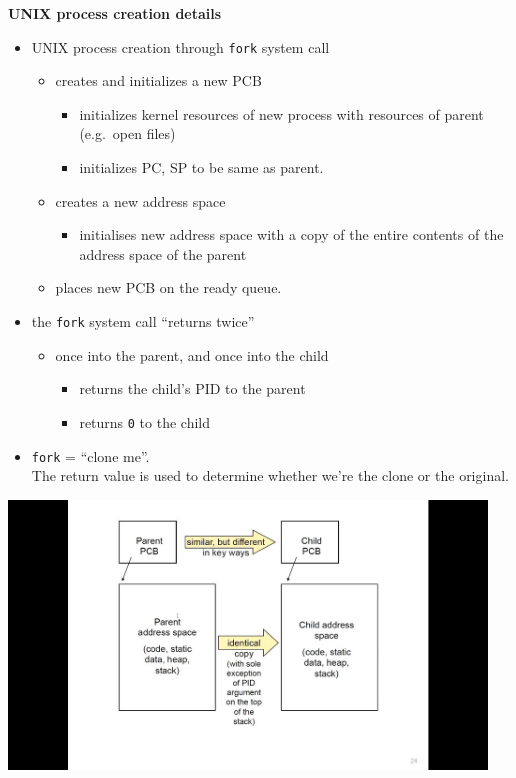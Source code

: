 \documentclass[11pt,a4paper]{article}
\begin{document}
\textbf{UNIX process creation details}
\begin{itemize}
    \item UNIX process creation through \texttt{fork} system call
        \begin{itemize}
            \item creates and initializes a new PCB
                \begin{itemize}
                    \item initializes kernel resources of new process with resources of parent
                        (e.g.\ open files)
                    \item initializes PC, SP to be same as parent.
                \end{itemize}
            \item creates a new address space
                \begin{itemize}
                    \item initialises new address space with a copy of the entire contents of
                        the address space of the parent
                \end{itemize}
            \item places new PCB on the ready queue.
        \end{itemize}
    \item the \texttt{fork} system call ``returns twice''
        \begin{itemize}
            \item once into the parent, and once into the child
                \begin{itemize}
                    \item returns the child's PID to the parent
                    \item returns \texttt{0} to the child
                \end{itemize}
        \end{itemize}
    \item \texttt{fork} = ``clone me''. \\
        The return value is used to determine whether we're the clone or the original.
\end{itemize}

\includegraphics[height=270]{fork.jpg}
\end{document}
